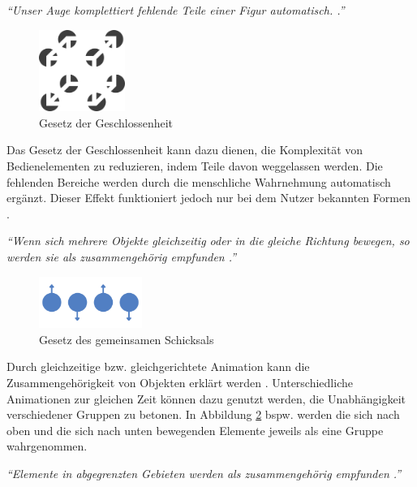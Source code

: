 \textit{\enquote{Unser Auge komplettiert fehlende Teile einer Figur automatisch. \cite[S. 187]{Moser2012}.}}\par
\begin{figure}[H]
 \centering
 \includegraphics[width=0.25\textwidth]{grafiken/geschlossenheit.png}
 \caption{Gesetz der Geschlossenheit \cite{WikiGestaltgesetze}}
 \label{fig:gesetzGeschloss}
\end{figure}
Das Gesetz der Geschlossenheit kann dazu dienen, die Komplexität von Bedienelementen zu reduzieren, indem Teile davon weggelassen werden. Die fehlenden Bereiche werden durch die menschliche Wahrnehmung automatisch ergänzt. Dieser Effekt funktioniert jedoch nur bei dem Nutzer bekannten Formen \cite{Moser2012}.\par
{}
\textit{\enquote{Wenn sich mehrere Objekte gleichzeitig oder in die gleiche Richtung bewegen, so werden sie als zusammengehörig empfunden \cite[S. 187]{Moser2012}.}}\par
\begin{figure}[H]
 \centering
 \includegraphics[width=0.2999\textwidth]{grafiken/schicksal.png}
 \caption{Gesetz des gemeinsamen Schicksals}
 \label{fig:gesetzSchicksal}
\end{figure}
Durch gleichzeitige bzw. gleichgerichtete Animation kann die Zusammengehörigkeit von Objekten erklärt werden \cite{Moser2012}. Unterschiedliche Animationen zur gleichen Zeit können dazu genutzt werden, die Unabhängigkeit verschiedener Gruppen zu betonen. In Abbildung \ref{fig:gesetzSchicksal} bspw. werden die sich nach oben und die sich nach unten bewegenden Elemente jeweils als eine Gruppe wahrgenommen.\par
{}
\textit{\enquote{Elemente in abgegrenzten Gebieten werden als zusammengehörig empfunden \cite{WikiGestaltgesetze}.}}\par
